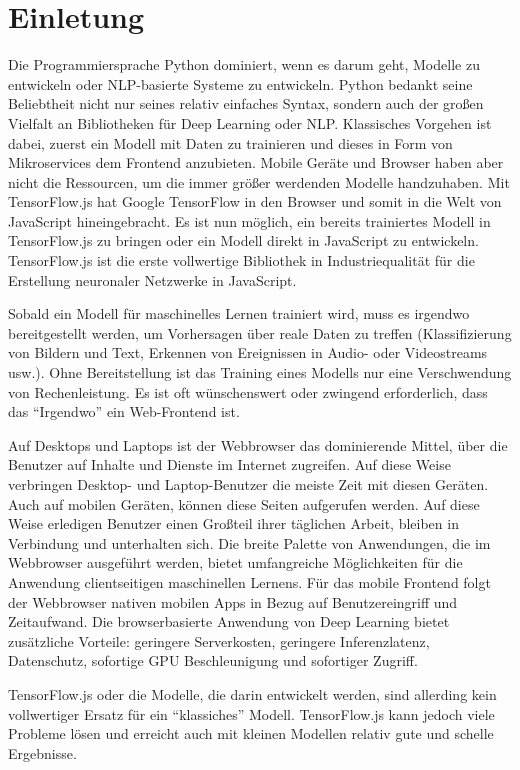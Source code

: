 \chapter{Einletung}
Die Programmiersprache Python dominiert, wenn es darum geht, Modelle zu entwickeln oder NLP-basierte Systeme zu entwickeln. Python bedankt seine Beliebtheit nicht nur seines relativ einfaches Syntax, sondern auch der großen Vielfalt an Bibliotheken für Deep Learning oder NLP. Klassisches Vorgehen ist dabei, zuerst ein Modell mit Daten zu trainieren und dieses in Form von Mikroservices dem Frontend anzubieten. Mobile Geräte und Browser haben aber nicht die Ressourcen, um die immer größer werdenden Modelle handzuhaben. Mit TensorFlow.js hat Google TensorFlow in den Browser und somit in die Welt von JavaScript hineingebracht. Es ist nun möglich, ein bereits trainiertes Modell in TensorFlow.js zu bringen oder ein Modell direkt in JavaScript zu entwickeln. TensorFlow.js ist die erste vollwertige Bibliothek in Industriequalität für die Erstellung neuronaler Netzwerke in JavaScript. 

Sobald ein Modell für maschinelles Lernen trainiert wird, muss es irgendwo bereitgestellt werden, um Vorhersagen über reale Daten zu treffen (\zb Klassifizierung von Bildern und Text, Erkennen von Ereignissen in Audio- oder Videostreams usw.). Ohne Bereitstellung ist das Training eines Modells nur eine Verschwendung von Rechenleistung. Es ist oft wünschenswert oder zwingend erforderlich, dass das \enquote{Irgendwo} ein Web-Frontend ist.

Auf Desktops und Laptops ist der Webbrowser das dominierende Mittel, über die Benutzer auf Inhalte und Dienste im Internet zugreifen. Auf diese Weise verbringen Desktop- und Laptop-Benutzer die meiste Zeit mit diesen Geräten. Auch auf mobilen Geräten, können diese Seiten aufgerufen werden. Auf diese Weise erledigen Benutzer einen Großteil ihrer täglichen Arbeit, bleiben in Verbindung und unterhalten sich. Die breite Palette von Anwendungen, die im Webbrowser ausgeführt werden, bietet umfangreiche Möglichkeiten für die Anwendung clientseitigen maschinellen Lernens. Für das mobile Frontend folgt der Webbrowser nativen mobilen Apps in Bezug auf Benutzereingriff und Zeitaufwand. Die browserbasierte Anwendung von Deep Learning bietet zusätzliche Vorteile: geringere Serverkosten, geringere Inferenzlatenz, Datenschutz, sofortige GPU Beschleunigung und sofortiger Zugriff.

TensorFlow.js oder die Modelle, die darin entwickelt werden, sind allerding kein vollwertiger Ersatz für ein \enquote{klassiches} Modell. TensorFlow.js kann jedoch viele Probleme lösen und erreicht auch mit kleinen Modellen relativ gute und schelle Ergebnisse.


